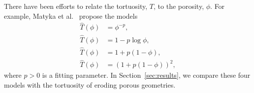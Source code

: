 \documentclass{jfm}
\begin{document}
There have been efforts to relate the tortuosity, $T$, to the porosity,
$\phi$.  For example, Matyka et al.~\citep{mat-kha-koz2008} propose the
models
\begin{subequations}
  \label{eqn:tortuosityModels}
  \begin{align}
    \widehat{T}(\phi) &= \phi^{-p}, \\
    \widehat{T}(\phi) &= 1-p \log \phi, \\
    \widehat{T}(\phi) &= 1+p (1-\phi), \\
    \widehat{T}(\phi) &= (1+p (1-\phi))^2, 
  \end{align}
\end{subequations}
where $p>0$ is a fitting parameter.  In Section~\ref{sec:results}, we
compare these four models with the tortuosity of eroding porous
geometries.

\end{document}
